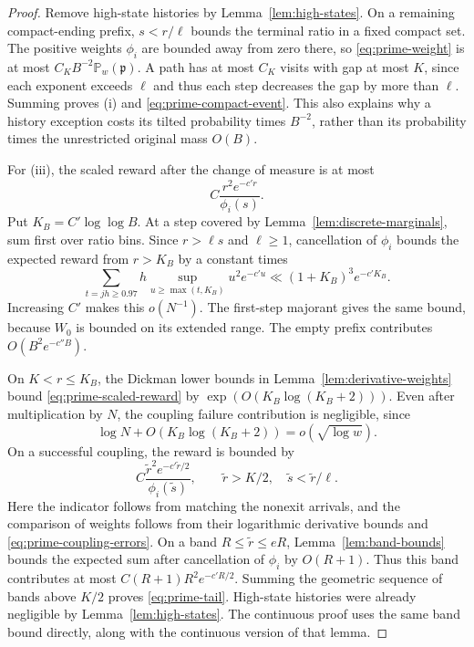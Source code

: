 \begin{proof}
Remove high-state histories by Lemma~\ref{lem:high-states}.  On a
remaining compact-ending prefix, $s<r/\ell$ bounds the terminal ratio
in a fixed compact set.  The positive weights $\phi_i$ are bounded
away from zero there, so \eqref{eq:prime-weight} is at most
$C_K B^{-2}\mathbb P_w(\mathfrak p)$.  A path has at most $C_K$ visits
with gap at most $K$, since each exponent exceeds $\ell$ and thus each
step decreases the gap by more than $\ell$.  Summing proves (i) and
\eqref{eq:prime-compact-event}.  This also explains why a history
exception costs its tilted probability times $B^{-2}$, rather than
its probability times the unrestricted original mass $O(B)$.

For (iii), the scaled reward after the change of measure is at most
\begin{equation}\label{eq:prime-scaled-reward}
 C\frac{r^2e^{-c'r}}{\phi_i(s)}.
\end{equation}
Put $K_B=C'\log\log B$.  At a step covered by
Lemma~\ref{lem:discrete-marginals}, sum first over ratio bins.  Since
$r>\ell s$ and $\ell\geq1$, cancellation of $\phi_i$ bounds the
expected reward from $r>K_B$ by a constant times
\begin{equation}\label{eq:prime-far-tail}
 \sum_{t=jh\geq0.97}h
       \sup_{u\geq\max(t,K_B)}u^2e^{-c'u}
 \ll (1+K_B)^3e^{-c'K_B}.
\end{equation}
Increasing $C'$ makes this $o(N^{-1})$.  The first-step majorant gives
the same bound, because $W_0$ is bounded on its extended range.  The
empty prefix contributes $O(B^2e^{-c''B})$.

On $K<r\leq K_B$, the Dickman lower bounds in
Lemma~\ref{lem:derivative-weights} bound
\eqref{eq:prime-scaled-reward} by
$\exp(O(K_B\log(K_B+2)))$.  Even after multiplication by $N$, the
coupling failure contribution is negligible, since
\[
 \log N+O(K_B\log(K_B+2))=o(\sqrt{\log w}).
\]
On a successful coupling, the reward is bounded by
\[
 C\frac{\widetilde r^2e^{-c'\widetilde r/2}}
          {\phi_i(\widetilde s)},\qquad
 \widetilde r>K/2,\quad \widetilde s<\widetilde r/\ell.
\]
Here the indicator follows from matching the nonexit arrivals, and
the comparison of weights follows from their logarithmic derivative
bounds and \eqref{eq:prime-coupling-errors}.  On a band
$R\leq\widetilde r\leq eR$, Lemma~\ref{lem:band-bounds} bounds the
expected sum after cancellation of $\phi_i$ by $O(R+1)$.  Thus this
band contributes at most $C(R+1)R^2e^{-c'R/2}$.  Summing the geometric
sequence of bands above $K/2$ proves \eqref{eq:prime-tail}.  High-state
histories were already negligible by Lemma~\ref{lem:high-states}.
The continuous proof uses the same band bound directly, along with
the continuous version of that lemma.


\end{proof}
